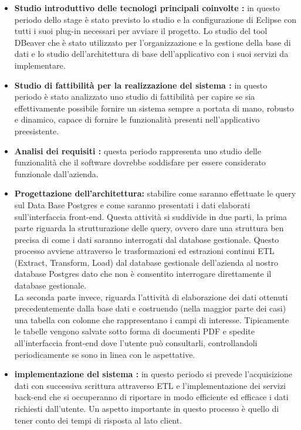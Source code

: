 \begin{itemize}


\item \textbf{Studio introduttivo delle tecnologi principali coinvolte :}
in questo periodo dello stage è stato previsto lo studio e la configurazione di Eclipse con tutti i suoi plug-in necessari per avviare il progetto. Lo studio del tool DBeaver che è stato utilizzato per l'organizzazione e la gestione della base di dati e lo studio dell'architettura di base dell'applicativo con i suoi servizi da implementare.

\item \textbf{Studio di fattibilità per la realizzazione del sistema :} in questo periodo è stato analizzato uno studio di fattibilità per capire se sia effettivamente possibile fornire un sistema sempre a portata di mano, robusto e dinamico, capace di fornire le funzionalità  presenti nell'applicativo preesistente.

\item \textbf{Analisi dei requisiti :} questa periodo rappresenta uno studio delle funzionalità che il software dovrebbe soddisfare per essere considerato funzionale dall'azienda. 

\item \textbf{Progettazione dell'architettura:} stabilire come saranno effettuate le query sul Data Base Postgres e come saranno presentati i dati elaborati sull'interfaccia front-end. Questa attività si suddivide in due parti, la prima parte riguarda la strutturazione delle query, ovvero dare una struttura ben precisa di come i dati saranno interrogati dal database gestionale. Questo processo avviene attraverso le trasformazioni ed estrazioni continui ETL (Extract, Transform, Load) dal database gestionale dell'azienda al nostro database Postgres dato che non è consentito interrogare direttamente il database gestionale. \\
La seconda parte invece, riguarda l'attività di elaborazione dei dati ottenuti precedentemente dalla base dati e costruendo (nella maggior parte dei casi) una tabella con colonne che rappresentano i campi di interesse. Tipicamente le tabelle vengono salvate sotto forma di documenti PDF e spedite all'interfaccia front-end dove l'utente può consultarli, controllandoli periodicamente se sono in linea con le aspettative. 

\item \textbf{implementazione del sistema :} in questo periodo si prevede l'acquisizione dati con successiva scrittura attraverso ETL e l'implementazione dei servizi back-end che si occuperanno di riportare in modo efficiente ed efficace i dati richiesti dall'utente. Un aspetto importante in questo processo è quello di tener conto dei tempi di risposta al lato client.


\end{itemize}
